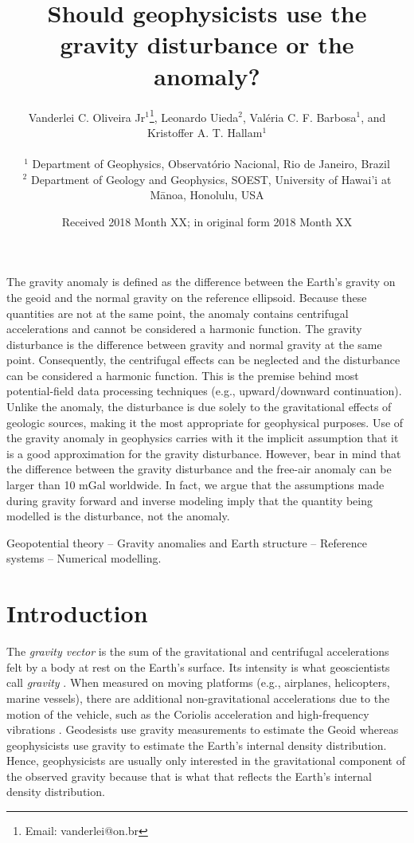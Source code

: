 \documentclass[extra]{gji}
\title[Gravity anomaly or gravity disturbance?]
      {Should geophysicists use the gravity disturbance or the anomaly?}
\author[Oliveira Jr et al.]{
\parbox{\linewidth}{%
    Vanderlei C. Oliveira Jr$^1$\thanks{Email: vanderlei@on.br},
    Leonardo Uieda$^2$, Val\'{e}ria C. F. Barbosa$^1$, and
    \linebreak Kristoffer A. T. Hallam$^{1}$
    \vspace{0.3cm}
}%
    \\
    $^1$ Department of Geophysics, Observat\'{o}rio Nacional, Rio de Janeiro, Brazil \\
    $^2$ Department of Geology and Geophysics, SOEST, University of Hawai'i at M\={a}noa, Honolulu, USA
}
\date{Received 2018 Month XX; in original form 2018 Month XX}
\begin{document}
\label{firstpage}

\maketitle


\begin{summary}
 The gravity anomaly is defined as the difference between the Earth's gravity
 on the geoid and the normal gravity on the reference ellipsoid.
 Because these quantities are not at the same point, the anomaly contains
 centrifugal accelerations and cannot be considered a harmonic function.
 The gravity disturbance is the difference between gravity and normal gravity
 at the same point.
 Consequently, the centrifugal effects can be neglected and the disturbance can
 be considered a harmonic function.
 This is the premise behind most potential-field data processing techniques
 (e.g., upward/downward continuation).
 Unlike the anomaly, the disturbance is due solely to the
 gravitational effects of geologic sources, making it the most appropriate
 for geophysical purposes.
 Use of the gravity anomaly in geophysics carries with it the implicit
 assumption that it is a good approximation for the gravity disturbance.
 However, bear in mind that the difference between the gravity disturbance and
 the free-air anomaly can be larger than 10 mGal worldwide.
 In fact, we argue that the assumptions made during gravity forward and inverse
 modeling imply that the quantity being modelled is the disturbance, not the
 anomaly.
\end{summary}

\begin{keywords}
 Geopotential theory -- Gravity anomalies and Earth structure -- Reference systems -- Numerical modelling.
\end{keywords}


\section{Introduction}

The \textit{gravity vector} is the sum of the gravitational and centrifugal
accelerations felt by a body at rest on the Earth's surface.
Its intensity is what geoscientists call \textit{gravity}
\citep{heiskanen-moritz1967, hofmann-wellenhof-moritz2005}.
When measured on moving platforms (e.g., airplanes,
helicopters, marine vessels), there are additional
non-gravitational accelerations due to the motion of the vehicle,
such as the Coriolis acceleration and high-frequency vibrations
\citep{glennie-etal2000,nabighian-etal2005-grav,baumann-etal2012}.
Geodesists use gravity measurements to estimate the Geoid \citep{li2001}
whereas geophysicists use gravity to estimate the Earth's
internal density distribution.
Hence, geophysicists are usually only interested
in the gravitational component of the observed gravity
because that is what that reflects the Earth's internal density distribution.
\end{document}
